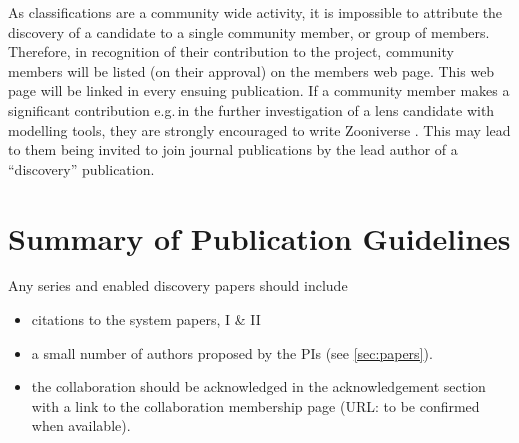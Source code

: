 \documentclass[a4paper,twocolumn]{article}
\begin{document}
As \SW classifications are a community wide activity, it is impossible to attribute the discovery of a candidate to a single community member, or group  of members. Therefore, in recognition of their contribution to the \SW project, \SW community members will be listed (on their approval) on the \SW members web page. This web page will be linked in every ensuing \SW publication. If a community member makes a significant contribution e.g.\,in the further investigation of a lens candidate with modelling tools, they are strongly encouraged to write Zooniverse \Letters. This may lead to them being invited to join journal publications by the lead author of a ``discovery'' publication. 


\section{Summary of Publication Guidelines}
\label{sec:publ}
Any \SW series and \SW enabled discovery papers should include
\begin{itemize}
\item citations to the \SW system papers, \SW I \& II
\item a small number of \SW authors proposed by the \SW PIs (see \ref{sec:papers}).
\item the collaboration should be acknowledged in the acknowledgement section with a link to the collaboration membership page (URL: to be confirmed when available).
\end{itemize}


\end{document}
